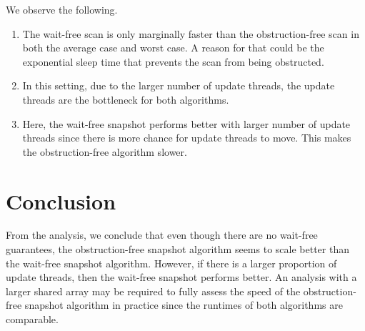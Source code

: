 \documentclass[conference,compsoc]{IEEEtran}
\begin{document}
We observe the following.
\begin{enumerate}
    \item The wait-free scan is only marginally faster than the obstruction-free
    scan in both the average case and worst case. A reason for that could be the
    exponential sleep time that prevents the scan from being obstructed.
    \item In this setting, due to the larger number of update threads, the
    update threads are the bottleneck for both algorithms.
    \item Here, the wait-free snapshot performs better with larger number of
    update threads since there is more chance for update threads to move. This
    makes the obstruction-free algorithm slower.
\end{enumerate}

\section{Conclusion}
\label{sec:conclusion}

From the analysis, we conclude that even though there are no wait-free
guarantees, the obstruction-free snapshot algorithm seems to scale better than
the wait-free snapshot algorithm. However, if there is a larger proportion of
update threads, then the wait-free snapshot performs better. An analysis with a
larger shared array may be required to fully assess the speed of the
obstruction-free snapshot algorithm in practice since the runtimes of both
algorithms are comparable.
\end{document}
